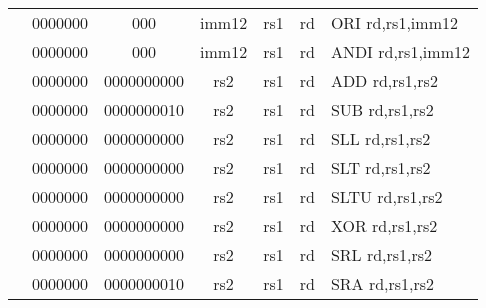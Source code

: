 \begin{table}[p]
\begin{small}
\begin{center}
\begin{tabular}{rcccccccccl}
&
\multicolumn{1}{|c|}{0000000} &
\multicolumn{2}{c|}{000} &
\multicolumn{4}{c|}{imm12} &
\multicolumn{1}{c|}{rs1} &
\multicolumn{1}{c|}{rd} & ORI rd,rs1,imm12 \\
\cline{2-10}
  

&
\multicolumn{1}{|c|}{0000000} &
\multicolumn{2}{c|}{000} &
\multicolumn{4}{c|}{imm12} &
\multicolumn{1}{c|}{rs1} &
\multicolumn{1}{c|}{rd} & ANDI rd,rs1,imm12 \\
\cline{2-10}
  

&
\multicolumn{1}{|c|}{0000000} &
\multicolumn{5}{c|}{0000000000} &
\multicolumn{1}{c|}{rs2} &
\multicolumn{1}{c|}{rs1} &
\multicolumn{1}{c|}{rd} & ADD rd,rs1,rs2 \\
\cline{2-10}
  

&
\multicolumn{1}{|c|}{0000000} &
\multicolumn{5}{c|}{0000000010} &
\multicolumn{1}{c|}{rs2} &
\multicolumn{1}{c|}{rs1} &
\multicolumn{1}{c|}{rd} & SUB rd,rs1,rs2 \\
\cline{2-10}
  

&
\multicolumn{1}{|c|}{0000000} &
\multicolumn{5}{c|}{0000000000} &
\multicolumn{1}{c|}{rs2} &
\multicolumn{1}{c|}{rs1} &
\multicolumn{1}{c|}{rd} & SLL rd,rs1,rs2 \\
\cline{2-10}
  

&
\multicolumn{1}{|c|}{0000000} &
\multicolumn{5}{c|}{0000000000} &
\multicolumn{1}{c|}{rs2} &
\multicolumn{1}{c|}{rs1} &
\multicolumn{1}{c|}{rd} & SLT rd,rs1,rs2 \\
\cline{2-10}
  

&
\multicolumn{1}{|c|}{0000000} &
\multicolumn{5}{c|}{0000000000} &
\multicolumn{1}{c|}{rs2} &
\multicolumn{1}{c|}{rs1} &
\multicolumn{1}{c|}{rd} & SLTU rd,rs1,rs2 \\
\cline{2-10}
  

&
\multicolumn{1}{|c|}{0000000} &
\multicolumn{5}{c|}{0000000000} &
\multicolumn{1}{c|}{rs2} &
\multicolumn{1}{c|}{rs1} &
\multicolumn{1}{c|}{rd} & XOR rd,rs1,rs2 \\
\cline{2-10}
  

&
\multicolumn{1}{|c|}{0000000} &
\multicolumn{5}{c|}{0000000000} &
\multicolumn{1}{c|}{rs2} &
\multicolumn{1}{c|}{rs1} &
\multicolumn{1}{c|}{rd} & SRL rd,rs1,rs2 \\
\cline{2-10}
  

&
\multicolumn{1}{|c|}{0000000} &
\multicolumn{5}{c|}{0000000010} &
\multicolumn{1}{c|}{rs2} &
\multicolumn{1}{c|}{rs1} &
\multicolumn{1}{c|}{rd} & SRA rd,rs1,rs2 \\
\cline{2-10}
  


\end{tabular}
\end{center}
\end{small}
\end{table}
